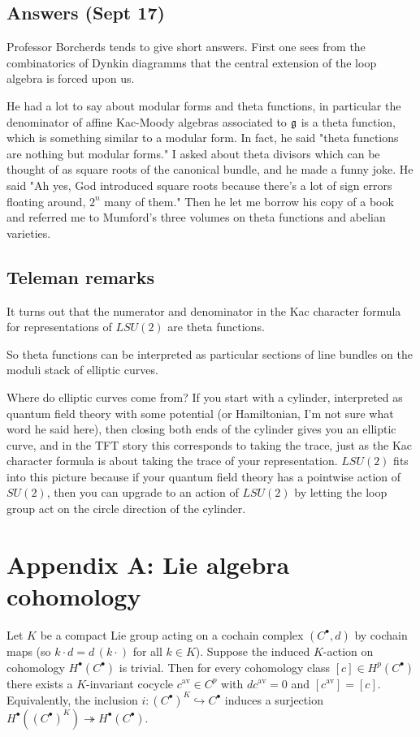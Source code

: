 \documentclass[12pt]{article}
\begin{document}
\subsection*{Answers (Sept 17)}
Professor Borcherds tends to give short answers. First one sees from the combinatorics of Dynkin diagramms that the central extension of the loop algebra is forced upon us. 

He had a lot to say about modular forms and theta functions, in particular the denominator of affine Kac-Moody algebras associated to $\mathfrak{g}$ is a theta function, which is something similar to a modular form. In fact, he said "theta functions are nothing but modular forms." I asked about theta divisors which can be thought of as square roots of the canonical bundle, and he made a funny joke. He said "Ah yes, God introduced square roots because there's a lot of sign errors floating around, $2^n$ many of them." Then he let me borrow his copy of a book and referred me to Mumford's three volumes on theta functions and abelian varieties.

\subsection*{Teleman remarks}
It turns out that the numerator and denominator in the Kac character formula for representations of $LSU(2)$ are theta functions. 

So theta functions can be interpreted as particular sections of line bundles on the moduli stack of elliptic curves. 

Where do elliptic curves come from? If you start with a cylinder, interpreted as quantum field theory with some potential (or Hamiltonian, I'm not sure what word he said here), then closing both ends of the cylinder gives you an elliptic curve, and in the TFT story this corresponds to taking the trace, just as the Kac character formula is about taking the trace of your representation. $LSU(2)$ fits into this picture because if your quantum field theory has a pointwise action of $SU(2)$, then you can upgrade to an action of $LSU(2)$ by letting the loop group act on the circle direction of the cylinder.

\section{Appendix A: Lie algebra cohomology}

\begin{lemma}\label{lem:invariant-representative}
    Let $K$ be a compact Lie group acting on a cochain complex $(C^\bullet,d)$ by
    cochain maps (so $k\cdot d = d\,(k\cdot)$ for all $k\in K$). Suppose the induced
    $K$-action on cohomology $H^\bullet(C^\bullet)$ is trivial. Then for every
    cohomology class $[c]\in H^p(C^\bullet)$ there exists a $K$-invariant cocycle
    $c^{\mathrm{av}}\in C^p$ with $dc^{\mathrm{av}}=0$ and $[c^{\mathrm{av}}]=[c]$.
    Equivalently, the inclusion $i:(C^\bullet)^K\hookrightarrow C^\bullet$
    induces a surjection $H^\bullet((C^\bullet)^K)\twoheadrightarrow H^\bullet(C^\bullet)$.
\end{lemma}
\end{document}
